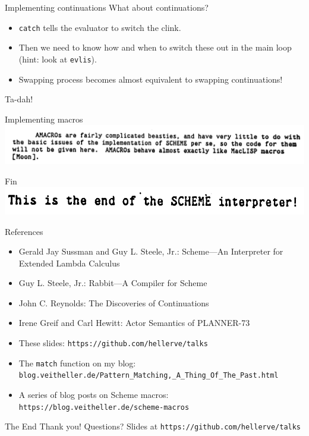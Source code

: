 \documentclass[aspectratio=169]{beamer}
\begin{document}
  \begin{frame}{Implementing continuations}
    What about continuations?

    \begin{itemize}
      \item \texttt{catch} tells the evaluator to switch the clink.
      \item Then we need to know how and when to switch these out in the main loop (hint: look at \texttt{evlis}).
      \item Swapping process becomes almost equivalent to swapping continuations!
    \end{itemize}

    Ta-dah!
  \end{frame}
  \begin{frame}{Implementing macros}
    \includegraphics[width=14cm]{beasties.png}
  \end{frame}
  \begin{frame}{Fin}
    \includegraphics[width=14cm]{interpreter_end.png}
  \end{frame}
  \begin{frame}{References}
    \begin{itemize}
      \item Gerald Jay Sussman and Guy L. Steele, Jr.: Scheme—An Interpreter for Extended Lambda Calculus
      \item Guy L. Steele, Jr.: Rabbit—A Compiler for Scheme
      \item John C. Reynolds: The Discoveries of Continuations
      \item Irene Greif and Carl Hewitt: Actor Semantics of PLANNER-73
      \item These slides: \texttt{https://github.com/hellerve/talks}
      \item The \texttt{match} function on my blog: \texttt{blog.veitheller.de/Pattern\_Matching,\_A\_Thing\_Of\_The\_Past.html}
      \item A series of blog posts on Scheme macros: \texttt{https://blog.veitheller.de/scheme-macros}
    \end{itemize}
  \end{frame}
  \begin{frame}{The End}
    \Huge Thank you!
    \linebreak
    \linebreak
    \linebreak
    \small Questions?
    \linebreak
    \linebreak
    \tiny Slides at \texttt{https://github.com/hellerve/talks}
  \end{frame}
\end{document}
